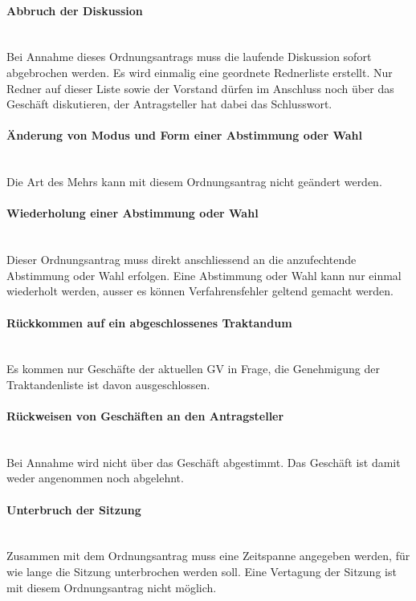 \documentclass[a4paper,11pt]{article}
\begin{document}
\paragraph{Abbruch der Diskussion} \ \\
Bei Annahme dieses Ordnungsantrags muss die laufende Diskussion sofort abgebrochen werden. Es wird einmalig eine geordnete Rednerliste erstellt. Nur Redner auf dieser Liste sowie der Vorstand dürfen im Anschluss noch über das Geschäft diskutieren, der Antragsteller hat dabei das Schlusswort.


\paragraph{Änderung von Modus und Form einer Abstimmung oder Wahl} \ \\
Die Art des Mehrs kann mit diesem Ordnungsantrag nicht geändert werden.


\paragraph{Wiederholung einer Abstimmung oder Wahl} \ \\
Dieser Ordnungsantrag muss direkt anschliessend an die anzufechtende Abstimmung oder Wahl erfolgen. Eine Abstimmung oder Wahl kann nur einmal wiederholt werden, ausser es können Verfahrensfehler geltend gemacht werden.


\paragraph{Rückkommen auf ein abgeschlossenes Traktandum} \ \\
Es kommen nur Geschäfte der aktuellen GV in Frage, die Genehmigung der Traktandenliste ist davon ausgeschlossen.


\paragraph{Rückweisen von Geschäften an den Antragsteller} \ \\
Bei Annahme wird nicht über das Geschäft abgestimmt. Das Geschäft ist damit weder angenommen noch abgelehnt.


\paragraph{Unterbruch der Sitzung} \ \\
Zusammen mit dem Ordnungsantrag muss eine Zeitspanne angegeben werden, für wie lange die Sitzung unterbrochen werden soll. Eine Vertagung der Sitzung ist mit diesem Ordnungsantrag nicht möglich.
\end{document}
